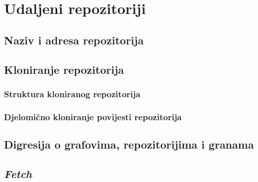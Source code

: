 \chapter*{Udaljeni repozitoriji}
\clearpage

\section*{Naziv i adresa repozitorija}
\clearpage

\section*{Kloniranje repozitorija}
\clearpage


\clearpage

\subsection*{Struktura kloniranog repozitorija}
\clearpage


\clearpage


\clearpage

\subsection*{Djelomično kloniranje povijesti repozitorija}
\clearpage

\clearpage

\section*{Digresija o grafovima, repozitorijima i granama}
\clearpage


\clearpage


\clearpage


\clearpage


\clearpage

\section*{\emph{Fetch}}
\clearpage


\clearpage

